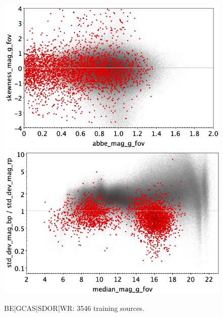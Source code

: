 \documentclass[longauth]{aa}
\begin{document}
\begin{appendix}
\begin{figure}
\vspace{4mm}
 \includegraphics[width=0.45\hsize]{figures/appendix/BE_trn_ask.png}  %
\hspace{2mm}
 \includegraphics[width=0.45\hsize]{figures/appendix/BE_trn_msdr.png}  \\ %
\vspace{4mm}
 \caption{BE|GCAS|SDOR|WR: 3546 training sources.}  
 \label{fig:app:BE_trn}
\end{figure}


\end{appendix}
\end{document}
